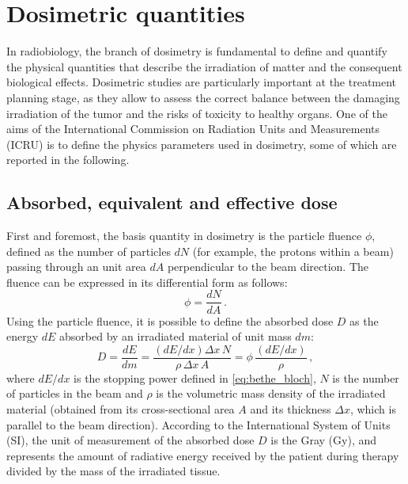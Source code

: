\section{Dosimetric quantities}\label{sec:dosimetric_quantities}
In radiobiology, the branch of dosimetry is fundamental to define and quantify the physical quantities that describe the irradiation of matter and the consequent biological effects. Dosimetric studies are particularly important at the treatment planning stage, as they allow to assess the correct balance between the damaging irradiation of the tumor and the risks of toxicity to healthy organs. One of the aims of the International Commission on Radiation Units and Measurements (ICRU) is to define the physics parameters used in dosimetry, some of which are reported in the following.
\subsection{Absorbed, equivalent and effective dose}\label{ssec:dose_definition}
First and foremost, the basis quantity in dosimetry is the particle fluence $\phi$, defined as the number of particles $dN$ (for example, the protons within a beam) passing through an unit area $dA$ perpendicular to the beam direction. The fluence can be expressed in its differential form as follows:
\begin{equation}
	\phi=\frac{dN}{dA}\,.
	\label{eq:fluence}
\end{equation}
Using the particle fluence, it is possible to define the absorbed dose $D$ as the energy $dE$ absorbed by an irradiated material of unit mass $dm$:
\begin{equation}
	D=\frac{dE}{dm}=\frac{\left(dE/dx\right)\Delta x\, N}{\rho\, \Delta x\,A}=\phi\,\frac{\left(dE/dx\right)}{\rho}\,,
	\label{eq:dose_as}
\end{equation}
where $dE/dx$ is the stopping power defined in \autoref{eq:bethe_bloch}, $N$ is the number of particles in the beam and $\rho$ is the volumetric mass density of the irradiated material (obtained from its cross-sectional area $A$ and its thickness $\Delta x$, which is parallel to the beam direction). According to the International System of Units (SI), the unit of measurement of the absorbed dose $D$ is the Gray (Gy), and represents the amount of radiative energy received by the patient during therapy divided by the mass of the irradiated tissue.

